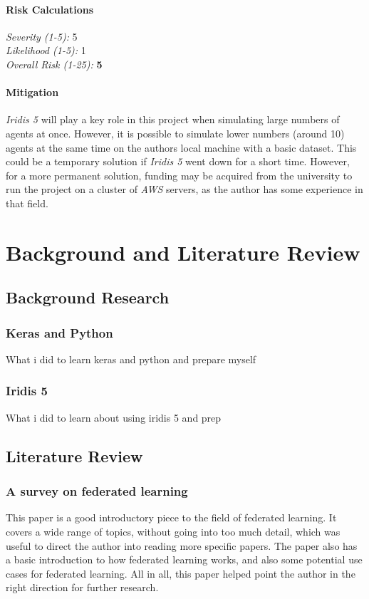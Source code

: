 \documentclass[12pt,a4paper,titlepage]{report}
\begin{document}
	\subsubsection{Risk Calculations}
	\emph{Severity (1-5):} 5 \\
	\emph{Likelihood (1-5):} 1 \\
	\emph{Overall Risk (1-25):} \textbf{5}
	\subsubsection{Mitigation}
	\emph{Iridis 5} will play a key role in this project when simulating large numbers of agents at once. However, it is possible to simulate lower numbers (around 10) agents at the same time on the authors local machine with a basic dataset. This could be a temporary solution if \emph{Iridis 5} went down for a short time. However, for a more permanent solution, funding may be acquired from the university to run the project on a cluster of \emph{AWS} servers, as the author has some experience in that field. 
	
	\chapter{Background and Literature Review}
	\section{Background Research}
	\subsection{Keras and Python}
	What i did to learn keras and python and prepare myself
	\subsection{Iridis 5}
	What i did to learn about using iridis 5 and prep
	\section{Literature Review}
	\subsection{A survey on federated learning \cite{survey_on_fed_learning}}
	This paper is a good introductory piece to the field of federated learning. It covers a wide range of topics, without going into too much detail, which was useful to direct the author into reading more specific papers. The paper also has a basic introduction to how federated learning works, and also some potential use cases for federated learning. All in all, this paper helped point the author in the right direction for further research.
\end{document}
